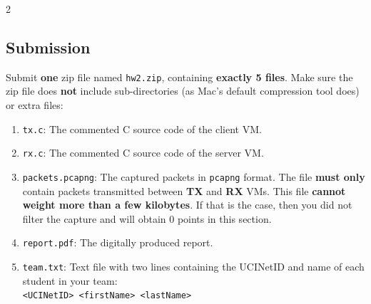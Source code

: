 \documentclass[12pt]{article}
\begin{document}
\begin{multicols}{2}
\subsection*{Submission}
Submit \textbf{one} zip file named \texttt{hw2.zip}, containing \textbf{exactly 5 files}. Make sure the zip file does \textbf{not} include sub-directories (as Mac's default compression tool does) or extra files:

\begin{enumerate}
\item \texttt{tx.c}: The commented C source code of the client VM.
\item \texttt{rx.c}: The commented C source code of the server VM.
\item \texttt{packets.pcapng}: The captured packets in \texttt{pcapng} format. The file \textbf{must only} contain packets transmitted between \textbf{TX} and \textbf{RX} VMs. This file \textbf{cannot weight more than a few kilobytes}. If that is the case, then you did not filter the capture and will obtain 0 points in this section.
\item  \texttt{report.pdf}: The digitally produced report.
\item \texttt{team.txt}: Text file with two lines containing the UCINetID and name of each student in your team:\\
  \texttt{<UCINetID> <firstName> <lastName>}
\end{enumerate}

\end{multicols}
\end{document}
